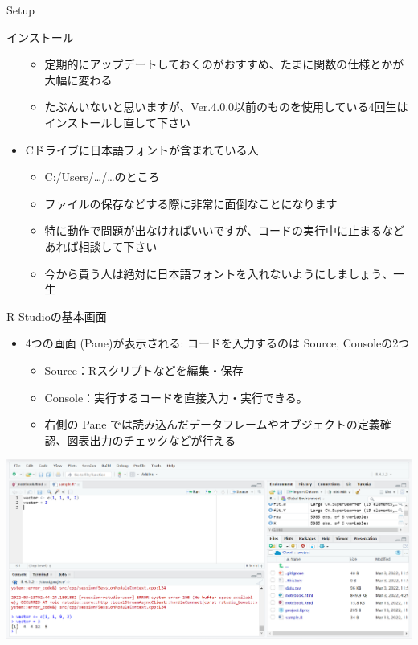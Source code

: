 \documentclass[
  ignorenonframetext,
]{beamer}
\providecommand{\tightlist}{%
  \setlength{\itemsep}{0pt}\setlength{\parskip}{0pt}}
\begin{document}
\begin{frame}[fragile]{Setup}
\begin{block}{インストール}
\begin{itemize}
  \begin{itemize}
  \tightlist
  \item
    定期的にアップデートしておくのがおすすめ、たまに関数の仕様とかが大幅に変わる
  \item
    たぶんいないと思いますが、Ver.4.0.0以前のものを使用している4回生はインストールし直して下さい
  \end{itemize}
\item
  Cドライブに日本語フォントが含まれている人

  \begin{itemize}
  \tightlist
  \item
    C:/Users/\ldots/\ldots のところ
  \item
    ファイルの保存などする際に非常に面倒なことになります
  \item
    特に動作で問題が出なければいいですが、コードの実行中に止まるなどあれば相談して下さい
  \item
    今から買う人は絶対に日本語フォントを入れないようにしましょう、一生
  \end{itemize}
\end{itemize}
\end{block}

\begin{block}{R Studioの基本画面}
\protect\hypertarget{r-studioux306eux57faux672cux753bux9762}{}
\begin{itemize}
\tightlist
\item
  4つの画面 (Pane)が表示される: コードを入力するのは Source,
  Consoleの2つ

  \begin{itemize}
  \tightlist
  \item
    Source：Rスクリプトなどを編集・保存
  \item
    Console：実行するコードを直接入力・実行できる。
  \item
    右側の Pane
    では読み込んだデータフレームやオブジェクトの定義確認、図表出力のチェックなどが行える
  \end{itemize}
\end{itemize}

\begin{center}\includegraphics[width=0.77\linewidth]{figs/rstudio_appearance} \end{center}
\end{block}


\end{frame}
\end{document}
